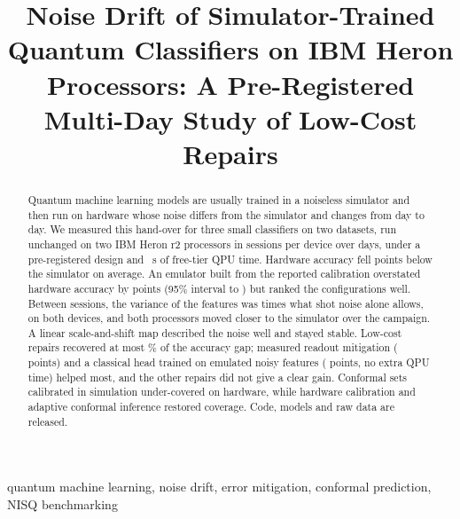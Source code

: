 \documentclass[10pt,conference]{IEEEtran}
\begin{document}
\title{Noise Drift of Simulator-Trained Quantum Classifiers on IBM Heron Processors:
A Pre-Registered Multi-Day Study of Low-Cost Repairs}

\author{\qdauthor}

\maketitle

\begin{abstract}
Quantum machine learning models are usually trained in a noiseless simulator and then run on
hardware whose noise differs from the simulator and changes from day to day. We measured this
hand-over for three small classifiers on two datasets, run unchanged on two IBM Heron r2
processors in  sessions per device over  days,
under a pre-registered design and ~s of free-tier QPU time. Hardware accuracy fell
 points below the simulator on average. %
An emulator built from the reported calibration overstated hardware accuracy by 
points (95\% interval  to ) but ranked the configurations well. %
Between sessions, the variance of the features was  times what shot noise alone allows, on both devices, %
and both processors moved closer to the simulator over the campaign. A linear %
scale-and-shift map described the noise well and stayed stable. %
Low-cost repairs recovered at most \% of the accuracy gap; measured readout
mitigation ( points) and a classical head trained on emulated noisy features
( points, no extra QPU time) helped most, %
and the other repairs did not give a clear gain. %
Conformal sets calibrated in simulation under-covered on hardware, while hardware calibration and
adaptive conformal inference restored coverage. %
Code, models and raw data are released.
\end{abstract}

\begin{IEEEkeywords}
quantum machine learning, noise drift, error mitigation, conformal prediction, NISQ benchmarking
\end{IEEEkeywords}
\end{document}
